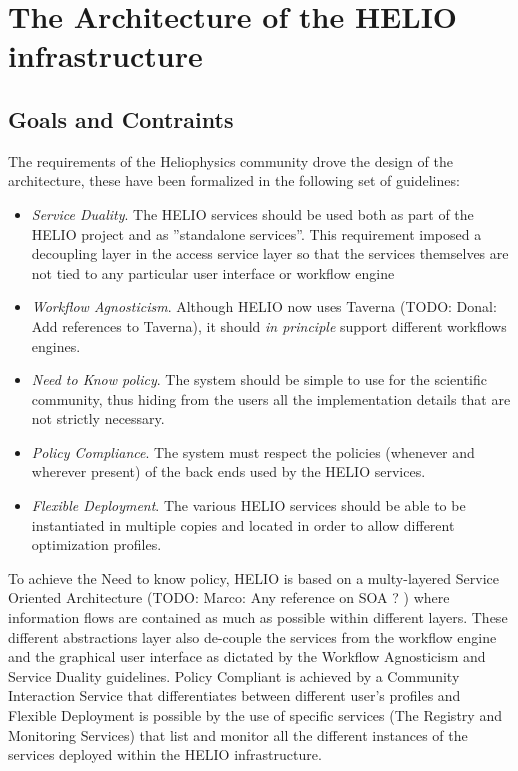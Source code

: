 \section{The Architecture of the HELIO infrastructure}

\subsection{Goals and Contraints}

The requirements of the Heliophysics community drove the design of the architecture, these have been formalized in the following set of guidelines:

\begin{itemize}
\item{\emph{Service Duality}. The HELIO services should be used both as part of the HELIO project and as ''standalone services''. This requirement imposed a decoupling layer in the access service layer so that the services themselves are not tied to any particular 
user interface or workflow engine}
\item{\emph{Workflow Agnosticism}. Although HELIO now uses Taverna (TODO: Donal: Add references to Taverna), it should \emph{in principle} support different workflows engines.}
\item{\emph{Need to Know policy}. The system should be simple to use for the scientific community, thus hiding from the users all the implementation details that are not strictly necessary.}
\item{\emph{Policy Compliance}. The system must respect the policies (whenever and wherever present) of the back ends used by the HELIO services.}
\item{\emph{Flexible Deployment}. The various HELIO services should be able to be instantiated in multiple copies and located in order to allow different optimization profiles.}
\end{itemize}

To achieve the Need to know policy, HELIO is based on a multy-layered Service Oriented Architecture (TODO: Marco: Any reference on SOA ? ) where information
flows are contained as much as possible within different layers. These different abstractions layer also de-couple the services from the workflow engine and the graphical user interface as dictated by the Workflow Agnosticism and Service Duality guidelines.
Policy Compliant is achieved by a Community Interaction Service that differentiates between different user's profiles and Flexible Deployment is possible by the use of specific services (The Registry and Monitoring Services) that list and monitor all the 
different instances of the services deployed within the HELIO infrastructure.

